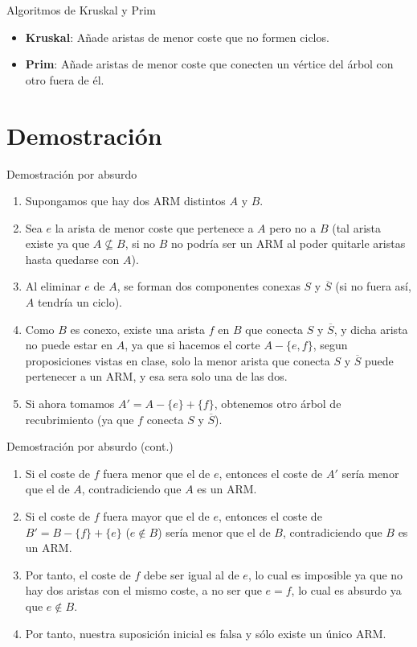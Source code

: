 \documentclass[aspectratio=169]{beamer}
\begin{document}
\begin{frame}{Algoritmos de Kruskal y Prim}
    \begin{itemize}
        \item \textbf{Kruskal}: Añade aristas de menor coste que no formen ciclos.
        \item \textbf{Prim}: Añade aristas de menor coste que conecten un vértice del árbol con otro fuera de él.
    \end{itemize}
\end{frame}

\section{Demostración}
\begin{frame}{Demostración por absurdo}
    \begin{enumerate}
        \item Supongamos que hay dos ARM distintos $A$ y $B$.
        \item Sea $e$ la arista de menor coste que pertenece a $A$ pero no a $B$ (tal arista existe ya que $A \nsubseteq B$, si no $B$ no podría ser un ARM al poder quitarle aristas hasta quedarse con $A$).
        \item Al eliminar $e$ de $A$, se forman dos componentes conexas $S$ y $\overline{S}$ (si no fuera así, $A$ tendría un ciclo).
        \item Como $B$ es conexo, existe una arista $f$ en $B$ que conecta $S$ y $\overline{S}$, y dicha arista no puede estar en $A$, ya que si hacemos el corte $A - \{e, f\}$, segun proposiciones vistas en clase, solo la menor arista que conecta $S$ y $\overline{S}$ puede pertenecer a un ARM, y esa sera solo una de las dos.
        \item Si ahora tomamos $A' = A - \{e\} + \{f\}$, obtenemos otro árbol de recubrimiento (ya que $f$ conecta $S$ y $\overline{S}$).
        
    \end{enumerate}
\end{frame}

\begin{frame}{Demostración por absurdo (cont.)}
    \begin{enumerate}
        \item Si el coste de $f$ fuera menor que el de $e$, entonces el coste de $A'$ sería menor que el de $A$, contradiciendo que $A$ es un ARM.
        \item Si el coste de $f$ fuera mayor que el de $e$, entonces el coste de $B' = B - \{f\} + \{e\}$ ($e \notin B$) sería menor que el de $B$, contradiciendo que $B$ es un ARM.
        \item Por tanto, el coste de $f$ debe ser igual al de $e$, lo cual es imposible ya que no hay dos aristas con el mismo coste, a no ser que $e = f$, lo cual es absurdo ya que $e \notin B$.
        \item Por tanto, nuestra suposición inicial es falsa y sólo existe un único ARM.
    \end{enumerate}
\end{frame}
\end{document}
